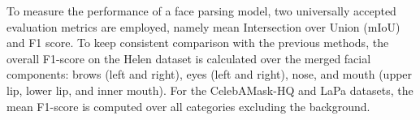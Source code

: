 \documentclass[10pt,twocolumn,letterpaper]{article}
\begin{document}
To measure the performance of a face parsing model, two universally accepted evaluation metrics are employed, namely mean Intersection over Union (mIoU) and F1 score. To keep consistent comparison with the previous methods, the overall F1-score on the Helen dataset is calculated over the merged facial components: brows (left and right), eyes (left and right), nose,  and mouth (upper lip, lower lip, and inner mouth). For the CelebAMask-HQ and LaPa datasets, the mean F1-score is computed over all categories excluding the background.

\begin{table}
  \small
  \centering
{}
\vspace{-2.5mm}
\caption{Comparisons of different contextual modules on the parsing branch. Here, ``+'' means that the context embedding is added into the baseline, and ``-pooling'' denotes that the pooling operation is removed from the context embedding.}
\vspace{-2mm}
\label{tab:ddgcn}
\end{table}
\end{document}
